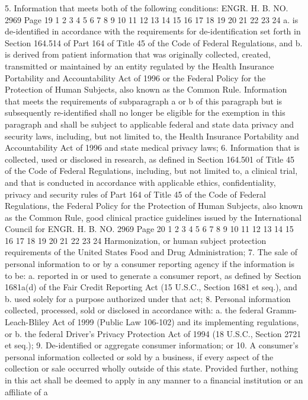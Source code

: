 5. Information that meets both of the following conditions:
ENGR. H. B. NO. 2969 Page 19
1
2
3
4
5
6
7
8
9
10
11
12
13
14
15
16
17
18
19
20
21
22
23
24
a. is de-identified in accordance with the requirements
for de-identification set forth in Section 164.514 of
Part 164 of Title 45 of the Code of Federal
Regulations, and
b. is derived from patient information that was
originally collected, created, transmitted or
maintained by an entity regulated by the Health
Insurance Portability and Accountability Act of 1996
or the Federal Policy for the Protection of Human
Subjects, also known as the Common Rule.
Information that meets the requirements of subparagraph a or b
of this paragraph but is subsequently re-identified shall no longer
be eligible for the exemption in this paragraph and shall be subject
to applicable federal and state data privacy and security laws,
including, but not limited to, the Health Insurance Portability and
Accountability Act of 1996 and state medical privacy laws;
6. Information that is collected, used or disclosed in
research, as defined in Section 164.501 of Title 45 of the Code of
Federal Regulations, including, but not limited to, a clinical
trial, and that is conducted in accordance with applicable ethics,
confidentiality, privacy and security rules of Part 164 of Title 45
of the Code of Federal Regulations, the Federal Policy for the
Protection of Human Subjects, also known as the Common Rule, good
clinical practice guidelines issued by the International Council for 
ENGR. H. B. NO. 2969 Page 20
1
2
3
4
5
6
7
8
9
10
11
12
13
14
15
16
17
18
19
20
21
22
23
24
Harmonization, or human subject protection requirements of the
United States Food and Drug Administration;
7. The sale of personal information to or by a consumer
reporting agency if the information is to be:
a. reported in or used to generate a consumer report, as
defined by Section 1681a(d) of the Fair Credit
Reporting Act (15 U.S.C., Section 1681 et seq.), and
b. used solely for a purpose authorized under that act;
8. Personal information collected, processed, sold or disclosed
in accordance with:
a. the federal Gramm-Leach-Bliley Act of 1999 (Public Law
106-102) and its implementing regulations, or
b. the federal Driver's Privacy Protection Act of 1994
(18 U.S.C., Section 2721 et seq.);
9. De-identified or aggregate consumer information; or
10. A consumer's personal information collected or sold by a
business, if every aspect of the collection or sale occurred wholly
outside of this state.
Provided further, nothing in this act shall be deemed to apply
in any manner to a financial institution or an affiliate of a
